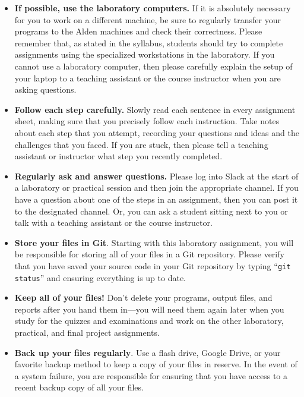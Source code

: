 \vspace*{-.1in}
\begin{itemize}
  \setlength{\itemsep}{-.01in}

\item {\bf If possible, use the laboratory computers.} If it is absolutely necessary for you to work on a different
  machine, be sure to regularly transfer your programs to the Alden machines and check their correctness. Please
  remember that, as stated in the syllabus, students should try to complete assignments using the specialized
  workstations in the laboratory. If you cannot use a laboratory computer, then please carefully explain the setup of
  your laptop to a teaching assistant or the course instructor when you are asking questions.

\item {\bf Follow each step carefully.} Slowly read each sentence in every assignment sheet, making sure that you
  precisely follow each instruction. Take notes about each step that you attempt, recording your questions and ideas
  and the challenges that you faced. If you are stuck, then please tell a teaching assistant or instructor what step
  you recently completed.

\item {\bf Regularly ask and answer questions.} Please log into Slack at the start of a laboratory or practical
  session and then join the appropriate channel. If you have a question about one of the steps in an assignment, then
  you can post it to the designated channel. Or, you can ask a student sitting next to you or talk with a teaching
  assistant or the course instructor.

\item {\bf Store your files in Git}. Starting with this laboratory assignment, you will be responsible for storing all
  of your files in a Git repository. Please verify that you have saved your source code in your Git repository by
  typing ``{\tt git status}'' and ensuring everything is up to date.

\item {\bf Keep all of your files!} Don't delete your programs, output files, and reports after you hand them in---you
  will need them again later when you study for the quizzes and examinations and work on the other laboratory,
  practical, and final project assignments.

\item {\bf Back up your files regularly}. Use a flash drive, Google Drive, or your favorite backup method to keep a
  copy of your files in reserve. In the event of a system failure, you are responsible for ensuring that you have
  access to a recent backup copy of all your files.


\end{itemize}

